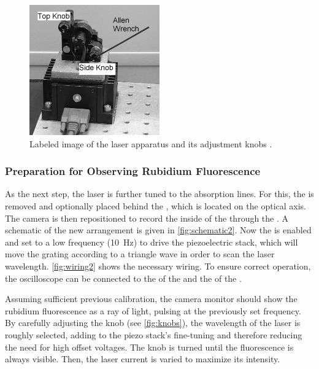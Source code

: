 \begin{figure}
    \centering
    \includegraphics[width=0.5\textwidth]{content/img/p31_Fig2.png}
    \caption{Labeled image of the laser apparatus and its adjustment knobs \cite{versuchsanleitung}.}
    \label{fig:knobs}
\end{figure}


\subsubsection{Preparation for Observing Rubidium Fluorescence}
As the next step,
the laser is further tuned to the  absorption lines.
For this,
the  is removed and optionally placed behind the ,
which is located on the optical axis.
The camera is then repositioned to record the inside of the  through the .
A schematic of the new arrangement is given in \autoref{fig:schematic2}.
Now the  is enabled and set to a low frequency (\SI{10}{\hertz}) to drive the piezoelectric stack,
which will move the grating according to a triangle wave in order to scan the laser wavelength.
\autoref{fig:wiring2} shows the necessary wiring.
To ensure correct operation,
the oscilloscope can be connected to
    the  of the  and
    the  of the .

Assuming sufficient previous calibration,
the camera monitor should show the rubidium fluorescence as a ray of light,
pulsing at the previously set frequency.
By carefully adjusting the  knob (see \autoref{fig:knobs}),
the wavelength of the laser is roughly selected,
adding to the piezo stack's fine-tuning
and therefore reducing the need for high offset voltages.
The knob is turned until the fluorescence is always visible.
Then, the laser current is varied to maximize its intensity.

